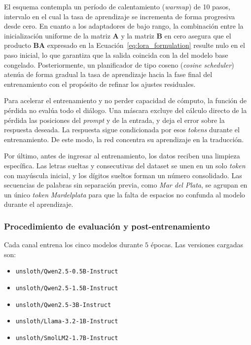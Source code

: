 El esquema contempla un período de calentamiento (\textit{warmup}) de 10 pasos, intervalo en el cual la tasa de aprendizaje se incrementa de forma progresiva desde cero. En cuanto a los adaptadores de bajo rango, la combinación entre la inicialización uniforme de la matriz $\mathbf{A}$ y la matriz $\mathbf{B}$ en cero asegura que el producto $\mathbf{B}\mathbf{A}$ expresado en la Ecuación~\ref{eq:lora_formulation} resulte nulo en el paso inicial, lo que garantiza que la salida coincida con la del modelo base congelado. Posteriormente, un planificador de tipo coseno (\textit{cosine scheduler}) atenúa de forma gradual la tasa de aprendizaje hacia la fase final del entrenamiento con el propósito de refinar los ajustes residuales.

Para acelerar el entrenamiento y no perder capacidad de cómputo, la función de pérdida no evalúa todo el diálogo. Una máscara excluye del cálculo directo de la pérdida las posiciones del \textit{prompt} y de la entrada, y deja el error sobre la respuesta deseada. La respuesta sigue condicionada por esos \textit{tokens} durante el entrenamiento. De este modo, la red concentra su aprendizaje en la traducción.

Por último, antes de ingresar al entrenamiento, los datos reciben una limpieza específica. Las letras sueltas y consecutivas del dataset se unen en un solo \textit{token} con mayúscula inicial, y los dígitos sueltos forman un número consolidado. Las secuencias de palabras sin separación previa, como \textit{Mar del Plata}, se agrupan en un único \textit{token} \textit{Mardelplata} para que la falta de espacios no confunda al modelo durante el aprendizaje.

\subsubsection{Procedimiento de evaluación y post-entrenamiento}
\label{sec:eval_lora}
Cada canal entrena los cinco modelos durante $5$ épocas. Las versiones cargadas son:
\begin{itemize}
    \item \texttt{unsloth/Qwen2.5-0.5B-Instruct}
    \item \texttt{unsloth/Qwen2.5-1.5B-Instruct}
    \item \texttt{unsloth/Qwen2.5-3B-Instruct}
    \item \texttt{unsloth/Llama-3.2-1B-Instruct}
    \item \texttt{unsloth/SmolLM2-1.7B-Instruct}
\end{itemize}

